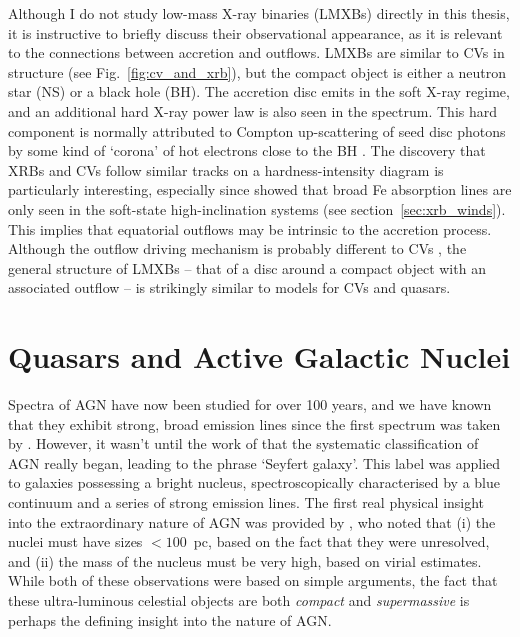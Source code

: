 Although I do not study low-mass X-ray binaries (LMXBs) 
directly in this thesis, it is instructive
to briefly discuss their observational appearance, 
as it is relevant to the connections between accretion and outflows.
LMXBs are similar to CVs in structure (see Fig.~\ref{fig:cv_and_xrb}), 
but the compact object is either a neutron star (NS) or a black hole (BH). 
The accretion disc 
emits in the soft X-ray regime, and an additional hard X-ray power law is also 
seen in the spectrum. This hard component is normally attributed
to Compton up-scattering of seed disc photons by some kind of `corona'
of hot electrons close to the BH \citep[e.g.][]{white1988,mitsuda1989,uttley2014}.
The discovery that XRBs and CVs follow similar 
tracks on a hardness-intensity diagram \citep[HID;][]{kordingDNjet2008}
is particularly interesting, especially since \cite{ponti2012}
showed that broad Fe absorption lines are only seen in the soft-state 
high-inclination systems (see section~\ref{sec:xrb_winds}). 
This implies that equatorial outflows may be intrinsic to 
the accretion process. Although the outflow driving mechanism
is probably different to CVs \citep[e.g.][]{diaztrigo2015}, 
the general structure of LMXBs -- that of a disc around a compact object with
an associated outflow -- is strikingly similar to models for CVs and quasars.




\section{Quasars and Active Galactic Nuclei}

Spectra of AGN have now been studied for over 100 years, and we have known 
that they exhibit strong, broad emission lines since the first spectrum was taken by
\cite{fath1909}. However, it wasn't until the work of \cite{seyfert1943} that the systematic 
classification of AGN really began, leading to the phrase `Seyfert galaxy'.
This label was applied to galaxies possessing a bright nucleus, spectroscopically
characterised by a blue continuum and a series of strong emission lines.
The first real physical insight into the extraordinary nature of AGN
was provided by \cite{woltjer1959}, who noted that 
(i) the nuclei must have sizes $<100$~pc,
based on the fact that they were unresolved, and (ii) the mass of the nucleus
must be very high, based on virial estimates. 
While both of these observations were based on simple arguments, the fact that these
ultra-luminous celestial objects are both {\em compact} and {\em supermassive}
is perhaps the defining insight into the nature of AGN.

